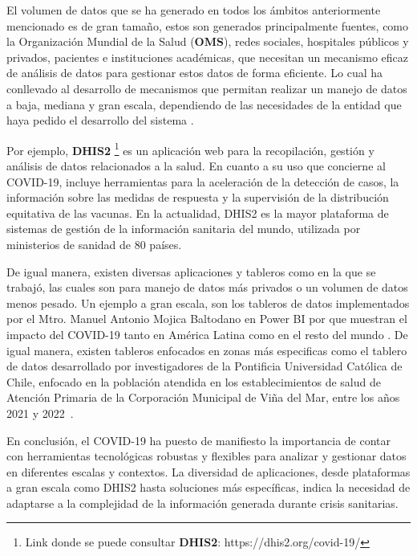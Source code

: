 El volumen de datos que se ha generado en todos los ámbitos anteriormente mencionado es de gran tamaño, estos son generados principalmente fuentes, como la Organización Mundial de la Salud (\textbf{OMS}), redes sociales, hospitales públicos y privados, pacientes e instituciones académicas, que necesitan un mecanismo eficaz de análisis de datos para gestionar estos datos de forma eficiente. Lo cual ha conllevado al desarrollo de mecanismos que permitan realizar un manejo de datos a baja, mediana y gran escala, dependiendo de las necesidades de la entidad que haya pedido el desarrollo del sistema \cite{fan2023accessibility}.

Por ejemplo, \textbf{DHIS2} \footnote{Link donde se puede consultar \textbf{DHIS2}: https://dhis2.org/covid-19/} es un aplicación web para la recopilación, gestión y análisis de datos relacionados a la salud. En cuanto a su uso que concierne al \textsc{COVID-19}, incluye herramientas para la aceleración de la detección de casos, la información sobre las medidas de respuesta y la supervisión de la distribución equitativa de las vacunas. En la actualidad, \textsc{DHIS2} es la mayor plataforma de sistemas de gestión de la información sanitaria del mundo, utilizada por ministerios de sanidad de 80 países.

De igual manera, existen diversas aplicaciones y tableros como en la que se trabajó, las cuales son para manejo de datos más privados o un volumen de datos menos pesado. Un ejemplo a gran escala, son los tableros de datos implementados por el Mtro. Manuel Antonio Mojica Baltodano en Power BI por que muestran el impacto del COVID-19 tanto en América Latina como en el resto del mundo \cite{mojica2020tableros}. De igual manera, existen tableros enfocados en zonas más especificas como el tablero de datos desarrollado por investigadores de la Pontificia Universidad Católica de Chile, enfocado en la población atendida en los establecimientos de salud de Atención Primaria de la Corporación Municipal de Viña del Mar, entre los años 2021 y 2022~\cite{gomez2023analisis}.

En conclusión, el \textsc{COVID-19} ha puesto de manifiesto la importancia de contar con herramientas tecnológicas robustas y flexibles para analizar y gestionar datos en diferentes escalas y contextos. La diversidad de aplicaciones, desde plataformas a gran escala como \textsc{DHIS2} hasta soluciones más específicas, indica la necesidad de adaptarse a la complejidad de la información generada durante crisis sanitarias.

